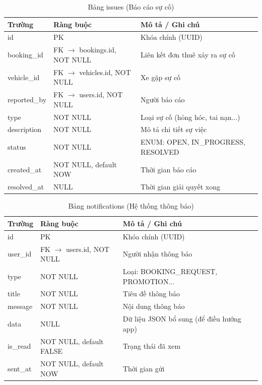 \vspace{0.5cm}

\begin{longtable}{p{\colField} p{\colConst} p{\colDesc}}
    \caption{Bảng issues (Báo cáo sự cố)} \label{tab:issues} \\
    \toprule
    \textbf{Trường} & \textbf{Ràng buộc} & \textbf{Mô tả / Ghi chú} \\
    \midrule
    \endfirsthead
    \bottomrule
    \endlastfoot

    id & PK & Khóa chính (UUID) \\
    booking\_id & FK $\to$ bookings.id, NOT NULL & Liên kết đơn thuê xảy ra sự cố \\
    vehicle\_id & FK $\to$ vehicles.id, NOT NULL & Xe gặp sự cố \\
    reported\_by & FK $\to$ users.id, NOT NULL & Người báo cáo \\
    type & NOT NULL & Loại sự cố (hỏng hóc, tai nạn...) \\
    description & NOT NULL & Mô tả chi tiết sự việc \\
    status & NOT NULL & ENUM: OPEN, IN\_PROGRESS, RESOLVED \\
    created\_at & NOT NULL, default NOW & Thời gian báo cáo \\
    resolved\_at & NULL & Thời gian giải quyết xong \\
\end{longtable}

\vspace{0.5cm}

\begin{longtable}{p{\colField} p{\colConst} p{\colDesc}}
    \caption{Bảng notifications (Hệ thống thông báo)} \label{tab:notifications} \\
    \toprule
    \textbf{Trường} & \textbf{Ràng buộc} & \textbf{Mô tả / Ghi chú} \\
    \midrule
    \endfirsthead
    \bottomrule
    \endlastfoot

    id & PK & Khóa chính (UUID) \\
    user\_id & FK $\to$ users.id, NOT NULL & Người nhận thông báo \\
    type & NOT NULL & Loại: BOOKING\_REQUEST, PROMOTION... \\
    title & NOT NULL & Tiêu đề thông báo \\
    message & NOT NULL & Nội dung thông báo \\
    data & NULL & Dữ liệu JSON bổ sung (để điều hướng app) \\
    is\_read & NOT NULL, default FALSE & Trạng thái đã xem \\
    sent\_at & NOT NULL, default NOW & Thời gian gửi \\
\end{longtable}


